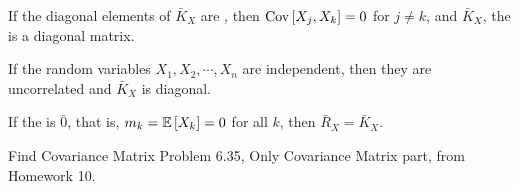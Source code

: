 \begin{definition}
\begin{remark}
			\end{remark}
			\begin{remark}
				If the diagonal elements of $\bar{K}_{X}$ are , then $\operatorname{\operatorname{Cov}} \left[ X_{j}, X_{k} \right] = 0$ for $j \neq k$, and $\bar{K}_{X}$, the  is a diagonal matrix.
			\end{remark}
			\begin{remark}
				If the random variables $X_{1},X_{2},\cdots,X_{n}$ are independent, then they are uncorrelated and $\bar{K}_{X}$ is diagonal.
			\end{remark}
			\begin{remark}
				If the  is $\bar{0}$, that is, $m_{k} = \operatorname{\operatorname{\mathbb{E}}} \left[ X_{k} \right] = 0$ for all $k$, then $\bar{R}_{X} = \bar{K}_{X}$.
			\end{remark}
		\end{definition}
		\begin{example}[Problem 6.35]{Find Covariance Matrix}
			Problem 6.35, Only Covariance Matrix part, from Homework 10.
		\end{example}
